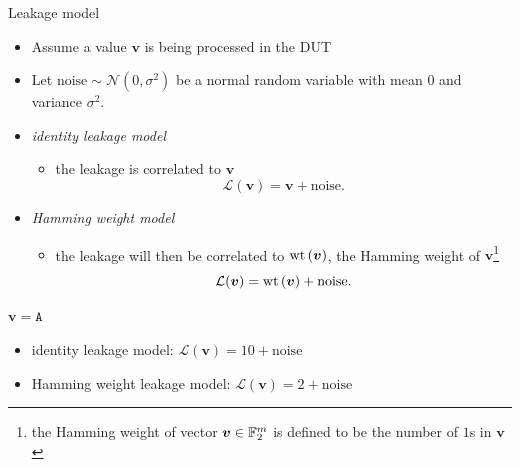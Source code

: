 \begin{frame}{Leakage model}
    \begin{itemize}
        \item Assume a value $\boldsymbol{v}$ is being processed in the DUT
        \item Let $\text{noise}\sim\mathcal{N}(0,\sigma^2)$ be a normal random variable with mean $0$ and variance $\sigma^2$.
        \item \textit{identity leakage model}
        \begin{itemize}
            \item the leakage is correlated to $\boldsymbol{v}$
           \[
\mathcal{L}(\boldsymbol{v})=\boldsymbol{v}+\text{noise}.
\]
        \end{itemize}
        \item \textit{Hamming weight model}
        \begin{itemize}
            \item the leakage will then be correlated to $\textrm{wt}\left(\boldsymbol{v}\right)$, the Hamming weight of $\boldsymbol{v}$\footnote{the Hamming weight of vector $\boldsymbol{v}\in{\mathbb F}_2^m$ is defined to be the number of $1$s in $\boldsymbol{v}$}
            \[
            \mathcal{L}(\boldsymbol{v})=\textrm{wt}\left(\boldsymbol{v}\right)+\text{noise}.
            \]
        \end{itemize}
    \end{itemize}
        \begin{example}
    $\boldsymbol{v}=\texttt{A}$
    \begin{itemize}
        \item identity leakage model: $\mathcal{L}(\boldsymbol{v})=10+\text{noise}$
        \item Hamming weight leakage model: $\mathcal{L}(\boldsymbol{v})=2+\text{noise}$
    \end{itemize}
    \end{example}
\end{frame}

